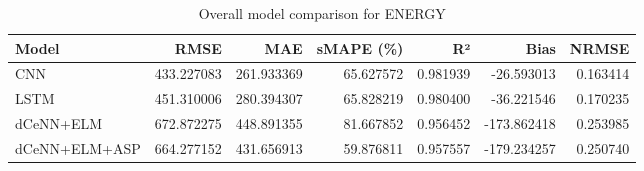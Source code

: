 \begin{table}
\caption{Overall model comparison for ENERGY}
\begin{tabular}{lrrrrrr}
\toprule
Model & RMSE & MAE & sMAPE (\%) & R² & Bias & NRMSE \\
\midrule
CNN & 433.227083 & 261.933369 & 65.627572 & 0.981939 & -26.593013 & 0.163414 \\
LSTM & 451.310006 & 280.394307 & 65.828219 & 0.980400 & -36.221546 & 0.170235 \\
dCeNN+ELM & 672.872275 & 448.891355 & 81.667852 & 0.956452 & -173.862418 & 0.253985 \\
dCeNN+ELM+ASP & 664.277152 & 431.656913 & 59.876811 & 0.957557 & -179.234257 & 0.250740 \\
\bottomrule
\end{tabular}
\end{table}
